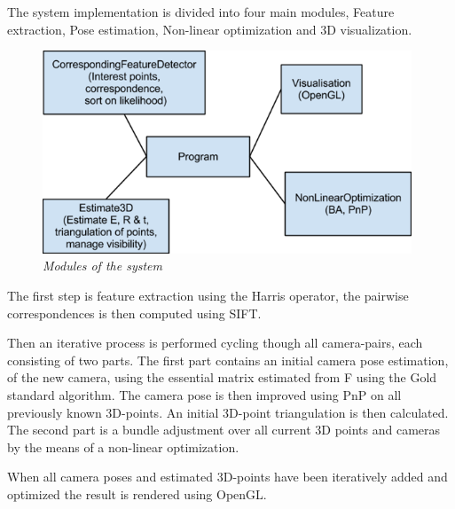 The system implementation is divided into four main modules, Feature extraction, Pose estimation, Non-linear optimization and 3D visualization.

\begin{figure}[htb]
	\centering
	\includegraphics[width=110mm]{images/system_modules.png}
	\caption{\textit{Modules of the system}}
	\label{fig:block_overview2_fig}  %
\end{figure}

The first step is feature extraction using the Harris operator, the pairwise correspondences is then computed using SIFT.

Then an iterative process is performed cycling though all camera-pairs, each consisting of two parts. The first part contains an initial camera pose estimation, of the new camera, using the essential matrix estimated from F using the Gold standard algorithm. The camera pose is then improved using PnP on all previously known 3D-points. An initial 3D-point triangulation is then calculated.
The second part is a bundle adjustment over all current 3D points and cameras by the means of a non-linear optimization.

When all camera poses and estimated 3D-points have been iteratively added and optimized the result is rendered using OpenGL.